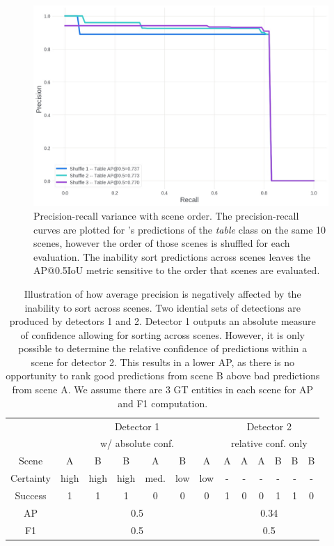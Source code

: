 \begin{figure}[]
    \centering
    \includegraphics[width=0.5\linewidth]{figs/prec-recall-shuffle.jpg}
    \caption{Precision-recall variance with scene order. The precision-recall curves are plotted for \METHOD{}'s predictions of the \textit{table} class on the same 10 scenes, however the order of those scenes is shuffled for each evaluation. The inability sort predictions across scenes leaves the AP@0.5IoU metric sensitive to the order that scenes are evaluated.}
    \label{fig:prec-rec}
\end{figure}

\begin{table}[]
    \centering
    \caption{Illustration of how average precision is negatively affected by the inability to sort across scenes. Two idential sets of detections are produced by detectors 1 and 2. Detector 1 outputs an absolute measure of confidence allowing for sorting across scenes. However, it is only possible to determine the relative confidence of predictions within a scene for detector 2. This results in a lower AP, as there is no opportunity to rank good predictions from scene B above bad predictions from scene A. We assume there are 3 GT entities in each scene for AP and F1 computation.}
    \begin{tabular}{c| cccccc | cccccc}
     & \multicolumn{6}{c|}{Detector 1} & \multicolumn{6}{c}{Detector 2} \\
     & \multicolumn{6}{c|}{w/ absolute conf.} & \multicolumn{6}{c}{relative conf. only} \\
     \hline \hline
     Scene    & A & B & B & A & B & A & A & A & A & B & B & B \\
     Certainty & high & high & high & med. & low & low     & - & - & - & - & - & - \\
     Success & 1 & 1 & 1 & 0 & 0 & 0    & 1 & 0 & 0 & 1 & 1 & 0 \\
     \hline
     AP & \multicolumn{6}{c|}{0.5} & \multicolumn{6}{c}{0.34} \\
     F1 & \multicolumn{6}{c|}{0.5} & \multicolumn{6}{c}{0.5}
    \end{tabular}
    \label{tab:pr-ranking}
\end{table}

